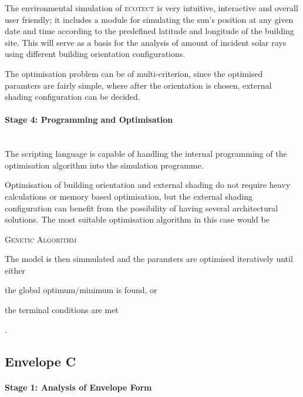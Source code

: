 The environmental simulation of \textsc{ecotect} is very intuitive, interactive and overall user friendly; it includes a module for simulating the sun's position at any given date and time according to the predefined latitude and longitude of the building site. This will serve as a basis for the analysis of amount of incident solar rays using different building orientation configurations.

The optimisation problem can be of multi-criterion, since the optimised paramters are fairly simple, where after the orientation is chosen, external shading configuration can be decided.

\paragraph{Stage 4: Programming and Optimisation}\mbox{}\\

The scripting language is capable of handling the internal programming of the optimisation algorithm into the simulation programme.

Optimisation of building orientation and external shading do not require heavy calculations or memory based optimisation, but the external shading configuration can benefit from the possibility of having several architectural solutions. The most suitable optimisation algorithm in this case would be 

\begin{compactenum}
\item \textsc{Genetic Algorithm}
\end{compactenum}

The model is then simmulated and the paramters are optimised iteratively until either \begin{inparaenum}[a)]\item the global optimum/minimum is found, or \item the terminal conditions are met\end{inparaenum}.

\clearpage
\subsection{Envelope C}

\paragraph{Stage 1: Analysis of Envelope Form}\mbox{}\\[2mm]

